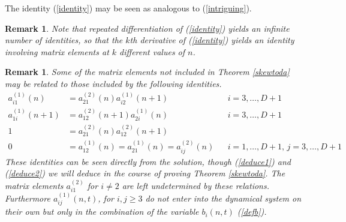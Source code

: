 \documentclass[12pt]{article}
\newtheorem{remark}[theorem]{Remark}
\theoremstyle{definition}
\begin{document}
The identity (\ref{identity}) may be seen as analogous to (\ref{intriguing}).

\begin{remark} Note that repeated differentiation of (\ref{identity}) yields an infinite number of identities, so that the $k$th derivative of (\ref{identity}) yields an identity involving matrix elements at $k$ different values of $n$.
\end{remark}

\begin{remark}
Some of the matrix elements not included in Theorem \ref{skewtoda} may be related to those included by the following identities.
\begin{align}
a_{i1}^{(1)}(n) &= a_{21}^{(2)}(n) a_{i2}^{(1)}(n+1) & & i = 3, \dots, D+1 \label{deduce1} \\
a_{1i}^{(1)}(n+1) &= a_{12}^{(2)}(n+1) a_{2i}^{(1)}(n) & & i = 3, \dots, D+1 \label{deduce2}  \\
1 &= a_{21}^{(2)}(n) a_{12}^{(2)}(n+1) \\
0 &= a_{12}^{(1)}(n) = a_{21}^{(1)}(n) = a_{ij}^{(2)}(n) & & i = 1, \dots, D+1, \, j=3, \dots, D+1
\end{align}
These identities can be seen directly from the solution, though (\ref{deduce1}) and (\ref{deduce2}) we will deduce in the course of proving Theorem \ref{skewtoda}. The matrix elements $a^{(2)}_{i1}$ for $i\neq 2$ are left undetermined by these relations.  Furthermore $a_{ij}^{(1)}(n,t)$, for $i,j \geq 3$ do not enter into the dynamical system on their own but only in the combination of the variable $b_i(n,t)$ (\ref{defb}).
\end{remark}
\end{document}
